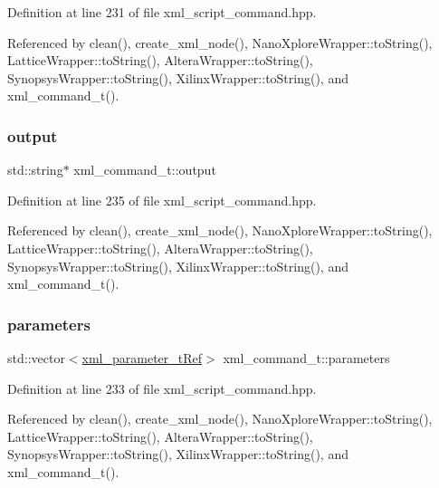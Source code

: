 Definition at line 231 of file xml\+\_\+script\+\_\+command.\+hpp.



Referenced by clean(), create\+\_\+xml\+\_\+node(), Nano\+Xplore\+Wrapper\+::to\+String(), Lattice\+Wrapper\+::to\+String(), Altera\+Wrapper\+::to\+String(), Synopsys\+Wrapper\+::to\+String(), Xilinx\+Wrapper\+::to\+String(), and xml\+\_\+command\+\_\+t().

\mbox{\label{classxml__command__t_aae33cc58ac942bd16bfdd3b4a9e16b10}} 
\subsubsection{\texorpdfstring{output}{output}}
{\footnotesize\ttfamily std\+::string$\ast$ xml\+\_\+command\+\_\+t\+::output}



Definition at line 235 of file xml\+\_\+script\+\_\+command.\+hpp.



Referenced by clean(), create\+\_\+xml\+\_\+node(), Nano\+Xplore\+Wrapper\+::to\+String(), Lattice\+Wrapper\+::to\+String(), Altera\+Wrapper\+::to\+String(), Synopsys\+Wrapper\+::to\+String(), Xilinx\+Wrapper\+::to\+String(), and xml\+\_\+command\+\_\+t().

\mbox{\label{classxml__command__t_ac03c6a34dd6173247c66d2fd03ea6208}} 
\subsubsection{\texorpdfstring{parameters}{parameters}}
{\footnotesize\ttfamily std\+::vector$<$\hyperlink{xml__script__command_8hpp_aec6b63d2a298703bc3ead113609b27a6}{xml\+\_\+parameter\+\_\+t\+Ref}$>$ xml\+\_\+command\+\_\+t\+::parameters}



Definition at line 233 of file xml\+\_\+script\+\_\+command.\+hpp.



Referenced by clean(), create\+\_\+xml\+\_\+node(), Nano\+Xplore\+Wrapper\+::to\+String(), Lattice\+Wrapper\+::to\+String(), Altera\+Wrapper\+::to\+String(), Synopsys\+Wrapper\+::to\+String(), Xilinx\+Wrapper\+::to\+String(), and xml\+\_\+command\+\_\+t().

